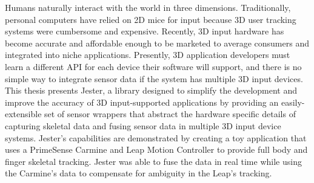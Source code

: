 Humans naturally interact with the world in three dimensions. Traditionally, personal computers have relied on 2D mice for input because 3D user tracking systems were cumbersome and expensive. Recently, 3D input hardware has become accurate and affordable enough to be marketed to average consumers and integrated into niche applications. Presently, 3D application developers must learn a different API for each device their software will support, and there is no simple way to integrate sensor data if the system has multiple 3D input devices. This thesis presents Jester, a library designed to simplify the development and improve the accuracy of 3D input-supported applications by providing an easily-extensible set of sensor wrappers that abstract the hardware specific details of capturing skeletal data and fusing sensor data in multiple 3D input device systems. Jester's capabilities are demonstrated by creating a toy application that uses a PrimeSense Carmine and Leap Motion Controller to provide full body and finger skeletal tracking. Jester was able to fuse the data in real time while using the Carmine's data to compensate for ambiguity in the Leap's tracking.
